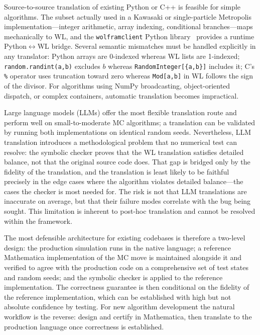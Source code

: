 \documentclass[twocolumn,10pt]{article}
\begin{document}
Source-to-source translation of existing Python or C++ is feasible for
simple algorithms.  The subset actually used in a Kawasaki or
single-particle Metropolis implementation---integer arithmetic, array
indexing, conditional branches---maps mechanically to WL, and the
\texttt{wolframclient} Python library~\cite{WolframClient} provides a
runtime Python$\leftrightarrow$WL bridge.  Several semantic mismatches
must be handled explicitly in any translator: Python arrays are
0-indexed whereas WL lists are 1-indexed; \texttt{random.randint(a,b)}
excludes $b$ whereas \texttt{RandomInteger[\{a,b\}]} includes it; C's
\texttt{\%} operator uses truncation toward zero whereas
\texttt{Mod[a,b]} in WL follows the sign of the divisor.  For
algorithms using NumPy broadcasting, object-oriented dispatch, or
complex containers, automatic translation becomes impractical.

Large language models (LLMs) offer the most flexible translation route
and perform well on small-to-moderate MC algorithms; a translation can
be validated by running both implementations on identical random seeds.
Nevertheless, LLM translation introduces a methodological problem that
no numerical test can resolve: the symbolic checker proves that the WL
translation satisfies detailed balance, not that the original source
code does.  That gap is bridged only by the fidelity of the translation,
and the translation is least likely to be faithful precisely in the edge
cases where the algorithm violates detailed balance---the cases the
checker is most needed for.  The risk is not that LLM translations are
inaccurate on average, but that their failure modes correlate with the
bug being sought.  This limitation is inherent to post-hoc translation
and cannot be resolved within the framework.

The most defensible architecture for existing codebases is therefore a
two-level design: the production simulation runs in the native language;
a reference Mathematica implementation of the MC move is maintained
alongside it and verified to agree with the production code on a
comprehensive set of test states and random seeds; and the symbolic
checker is applied to the reference implementation.  The correctness
guarantee is then conditional on the fidelity of the reference
implementation, which can be established with high but not absolute
confidence by testing.  For new algorithm development the natural
workflow is the reverse: design and certify in Mathematica, then
translate to the production language once correctness is established.
\end{document}
